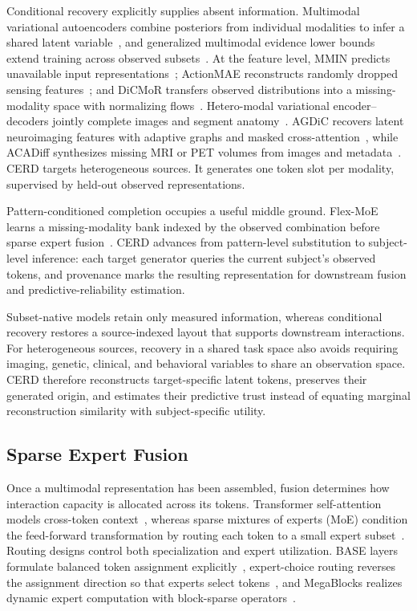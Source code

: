 \documentclass[a4paper,fleqn]{cas-dc}
\begin{document}
Conditional recovery explicitly supplies absent information. Multimodal variational autoencoders combine posteriors from individual modalities to infer a shared latent variable~\cite{ref_wu2018mvae}, and generalized multimodal evidence lower bounds extend training across observed subsets~\cite{ref_sutter2021gmelbo}. At the feature level, MMIN predicts unavailable input representations~\cite{zhao2021mmin}; ActionMAE reconstructs randomly dropped sensing features~\cite{woo2023actionmae}; and DiCMoR transfers observed distributions into a missing-modality space with normalizing flows~\cite{wang2023dicmor}. Hetero-modal variational encoder--decoders jointly complete images and segment anatomy~\cite{dorent2019hved}. AGDiC recovers latent neuroimaging features with adaptive graphs and masked cross-attention~\cite{li2025agdic}, while ACADiff synthesizes missing MRI or PET volumes from images and metadata~\cite{zhou2026acadiff}. CERD targets heterogeneous sources. It generates one token slot per modality, supervised by held-out observed representations.

Pattern-conditioned completion occupies a useful middle ground. Flex-MoE learns a missing-modality bank indexed by the observed combination before sparse expert fusion~\cite{ref_flexmoe}. CERD advances from pattern-level substitution to subject-level inference: each target generator queries the current subject's observed tokens, and provenance marks the resulting representation for downstream fusion and predictive-reliability estimation.

Subset-native models retain only measured information, whereas conditional recovery restores a source-indexed layout that supports downstream interactions. For heterogeneous sources, recovery in a shared task space also avoids requiring imaging, genetic, clinical, and behavioral variables to share an observation space. CERD therefore reconstructs target-specific latent tokens, preserves their generated origin, and estimates their predictive trust instead of equating marginal reconstruction similarity with subject-specific utility.

\subsection{Sparse Expert Fusion}

Once a multimodal representation has been assembled, fusion determines how interaction capacity is allocated across its tokens. Transformer self-attention models cross-token context~\cite{vaswani2017attention}, whereas sparse mixtures of experts (MoE) condition the feed-forward transformation by routing each token to a small expert subset~\cite{shazeer2017moe,lepikhin2021gshard,fedus2022switch}. Routing designs control both specialization and expert utilization. BASE layers formulate balanced token assignment explicitly~\cite{lewis2021base}, expert-choice routing reverses the assignment direction so that experts select tokens~\cite{zhou2022expertchoice}, and MegaBlocks realizes dynamic expert computation with block-sparse operators~\cite{gale2023megablocks}.
\end{document}
